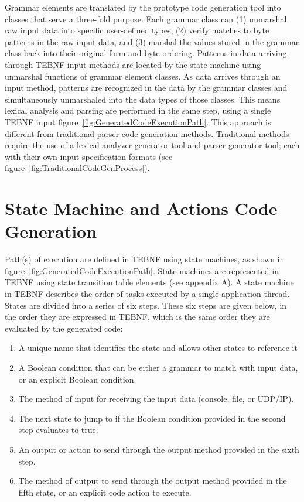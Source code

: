 \indent
Grammar elements are translated by the prototype code generation tool into classes that serve a three-fold purpose.  Each grammar class can (1) unmarshal raw input data into specific user-defined types, (2) verify matches to byte patterns in the raw input data, and (3) marshal the values stored in the grammar class back into their original form and byte ordering.  Patterns in data arriving through TEBNF input methods are located by the state machine using unmarshal functions of grammar element classes.  As data arrives through an input method, patterns are recognized in the data by the grammar classes and simultaneously unmarshaled into the data types of those classes.  This means lexical analysis and parsing are performed in the same step, using a single TEBNF input figure~\ref{fig:GeneratedCodeExecutionPath}.  This approach is different from traditional parser code generation methods.  Traditional methods require the use of a lexical analyzer generator tool and parser generator tool; each with their own input specification formats (see figure~\ref{fig:TraditionalCodeGenProcess}).

\section{State Machine and Actions Code Generation}
Path(s) of execution are defined in TEBNF using state machines, as shown in figure~\ref{fig:GeneratedCodeExecutionPath}.  State machines are represented in TEBNF using state transition table elements (see appendix A).  A state machine in TEBNF describes the order of tasks executed by a single application thread.  States are divided into a series of six steps.  These six steps are given below, in the order they are expressed in TEBNF, which is the same order they are evaluated by the generated code:
\begin{enumerate}
  \item A unique name that identifies the state and allows other states to reference it
  \item A Boolean condition that can be either a grammar to match with input data, or an explicit Boolean condition.
  \item The method of input for receiving the input data (console, file, or UDP/IP).
  \item The next state to jump to if the Boolean condition provided in the second step evaluates to true.
  \item An output or action to send through the output method provided in the sixth step.
  \item The method of output to send through the output method provided in the fifth state, or an explicit code action to execute.
\end{enumerate}

